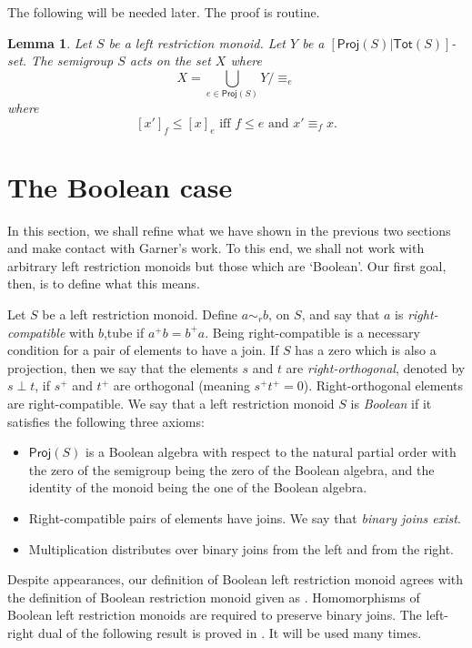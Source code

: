 \documentclass[a4paper]{amsart}
\newtheorem{lemma}[theorem]{Lemma}
\begin{document}
The following will be needed later.
The proof is routine.

\begin{lemma}\label{lem:agatha}
Let $S$ be a left restriction monoid.
Let $Y$ be a $[\mathsf{Proj}(S)|\mathsf{Tot}(S)]$-set.
The semigroup $S$ acts on the set $X$ where
$$X = \bigcup_{e \in \mathsf{Proj}(S)} Y/\equiv_{e}$$
where
$$[x']_{f} \leq [x]_{e} \text{ iff } f \leq e \text{ and } x' \equiv_{f} x.$$ 
\end{lemma}



\section{The Boolean case}

In this section, we shall refine what we have shown in the previous two sections
and make contact with Garner's work.
To this end, we shall not work with arbitrary left restriction monoids but those which are `Boolean'.
Our first goal, then, is to define what this means.


Let $S$ be a left restriction monoid.
Define $a \sim_{r} b$, on $S$, and say that $a$ is {\em right-compatible} with $b$,tube
if $a^{+}b = b^{+}a$.
Being right-compatible is a necessary condition for a pair of elements to have a join.
If $S$ has a zero which is also a projection,
then we say that the elements $s$ and $t$ are {\em right-orthogonal}, denoted by $s \perp t$, if $s^{+}$ and $t^{+}$ are orthogonal (meaning $s^{+}t^{+} = 0$).
Right-orthogonal elements are right-compatible.
We say that a left restriction monoid $S$ is {\em Boolean} if it satisfies the following three axioms:
\begin{itemize}
\item[{\rm (B1).}] $\mathsf{Proj}(S)$ is a Boolean algebra with respect to the natural partial order
with the zero of the semigroup being the zero of the Boolean algebra, and the identity of the monoid being the
one of the Boolean algebra. 
\item[{\rm (B2).}] Right-compatible pairs of elements have joins. We say that {\em binary joins exist}.
\item[{\rm (B3).}] Multiplication distributes over binary joins from the left and from the right. 
\end{itemize}
Despite appearances, our definition of Boolean left restriction monoid agrees with the definition
of Boolean restriction monoid given as \cite[Definition 3.2]{G2025}.
Homomorphisms of Boolean left restriction monoids are required to preserve binary joins.
The left-right dual of the following result is proved in \cite[Lemma 3.1]{L2025}.
It will be used many times.
\end{document}
